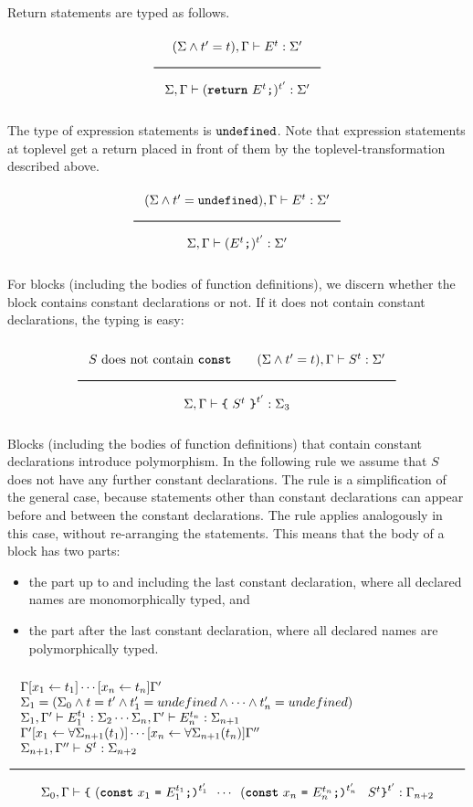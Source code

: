 \noindent
Return statements are typed as follows.
\[
\Rule{
(\Sigma \wedge t' = t), \Gamma \vdash E^{t} : \Sigma' }{
\Sigma, \Gamma \vdash (\Return\ E^{t} \texttt{;})^{t'} : \Sigma'}
\]

\noindent
The type of expression statements is $\texttt{undefined}$. Note that expression statements
at toplevel get a return placed in front of them by the toplevel-transformation described above.
\[
\Rule{
(\Sigma \wedge t' = \Undefined), \Gamma \vdash E^{t} : \Sigma' }{
\Sigma, \Gamma \vdash (E^{t} \texttt{;})^{t'} : \Sigma'}
\]

\noindent
For blocks (including the bodies of function definitions), we discern whether the
block contains constant declarations or not. If it does not contain constant
declarations, the typing is easy:

\[
\Rule{
  S\ \textrm{does not contain }\Const \qquad
  (\Sigma \wedge t' = t), \Gamma \vdash S^{t} : \Sigma' }{
\Sigma, \Gamma \vdash \Lc \ S^{t} \ \Rc^{t'}  : \Sigma_3}
\]

\noindent
Blocks (including the bodies of function definitions) that 
contain constant declarations introduce polymorphism. In the following
rule we assume that $S$ does not have any further constant declarations. The rule
is a simplification of the general case, because statements other than constant
declarations can appear before and between the constant declarations. The rule
applies analogously in this case, without re-arranging the statements. This means
that the body of a block has two parts:
\begin{itemize}
\item the part up to and including the last constant declaration, where all
  declared names are monomorphically typed, and
\item the part after the last constant declaration, where all declared names
  are polymorphically typed.
\end{itemize}

\[
\Rule{
  \begin{minipage}{120mm}
    $\Gamma[x_1 \leftarrow t_1]\cdots[x_n \leftarrow t_n]\Gamma' $\\
    $\Sigma_1 = (\Sigma_0 \wedge t = t' \wedge t'_1 = undefined \wedge \cdots \wedge t'_n = undefined)$ \\
    $\Sigma_1, \Gamma' \vdash E_1^{t_1} : \Sigma_2 \cdots
     \Sigma_n, \Gamma' \vdash E_n^{t_n} : \Sigma_{n+1}$\\
    $\Gamma'[x_1 \leftarrow \forall \Sigma_{n+1}(t_1)]\cdots[x_n \leftarrow \forall \Sigma_{n+1}(t_n)]\Gamma'' $\\
    $\Sigma_{n+1}, \Gamma'' \vdash S^t : \Sigma_{n+2}$
  \end{minipage}
}{
  \Sigma_0, \Gamma \vdash \Lc\
  (\Const\ x_1 \ \texttt{=}\ E_1^{t_1} \texttt{;)}^{t'_1} \texttt{ } \cdots \texttt{ }
  (\Const\ x_n \ \texttt{=}\ E_n^{t_n} \texttt{;)}^{t'_n} \texttt{ } \ S^t \Rc^{t'} : \Gamma_{n+2}
}
\]


